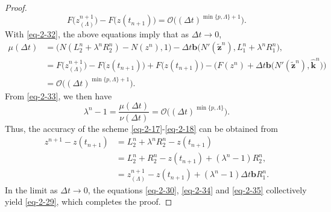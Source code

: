 \documentclass[10pt,a4paper]{amsart}
\begin{document}
\begin{proof}
\begin{equation*}
	F\big(z_{(\Lambda)}^{n+1}\big)-F\big(z(t_{n+1})\big)=\mathcal{O}\big((\Delta t)^{\min\{p,\Lambda\}+1}\big).
\end{equation*}
With \eqref{eq-2-32}, the above equations imply that as $\Delta t\rightarrow 0$,
\begin{equation*}
	\begin{aligned}
		\mu(\Delta t)&=\big(N(L_2^n+\lambda^nR_2^n)-N(z^n),1\big)-\Delta t\textbf{b}\big(N'(\tilde{\textbf{z}}^n),L_1^n+\lambda^nR_1^n\big),\\
		&=F\big(z_{(\Lambda)}^{n+1}\big)-F\big(z(t_{n+1})\big)+F\big(z(t_{n+1})\big)-\big(F(z^n)+\Delta t\textbf{b}\big(N'(\tilde{\textbf{z}}^n),\hat{\textbf{k}}^n\big)\big)\\
		&=\mathcal{O}\big((\Delta t)^{\min\{p,\Lambda\}+1}\big).
	\end{aligned}
\end{equation*}	
From \eqref{eq-2-33}, we then have
\begin{equation}\label{eq-2-35}
	\lambda^n-1=\frac{\mu(\Delta t)}{\nu(\Delta t)}=\mathcal{O}\big((\Delta t)^{\min\{p,\Lambda\}}\big).
\end{equation}
Thus, the accuracy of the scheme \eqref{eq-2-17}-\eqref{eq-2-18} can be obtained from
\begin{equation*}
	\begin{aligned}
		z^{n+1}-z(t_{n+1})&=L_2^n+\lambda^nR_2^n-z(t_{n+1})\\
		&=L_2^n+R_2^n-z(t_{n+1})+(\lambda^n-1)R_2^n,\\
		&=z_{(\Lambda)}^{n+1}-z(t_{n+1})+(\lambda^n-1)\Delta t\textbf{b}R_1^n.
	\end{aligned}
\end{equation*}	
In the limit as $\Delta t\rightarrow 0$, the equations \eqref{eq-2-30}, \eqref{eq-2-34} and \eqref{eq-2-35} collectively yield \eqref{eq-2-29}, which completes the proof.
\end{proof}
\end{document}
